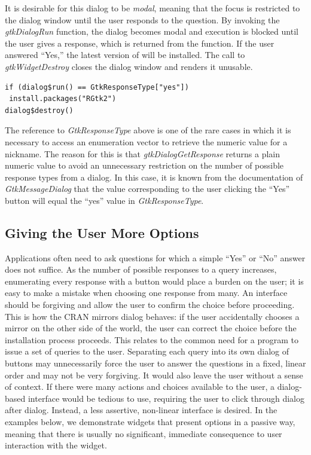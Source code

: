 \documentclass[article]{jss}
\begin{document}
It is desirable for this dialog to be \emph{modal}, meaning that the focus
is restricted to the dialog window until the user responds to the question. By
invoking the \emph{gtkDialogRun} function, the dialog becomes modal and execution
is blocked until the user gives a response, which is returned from the function.
If the user answered ``Yes,'' the latest version of  will be 
installed. The call to \emph{gtkWidgetDestroy} closes the dialog window and 
renders it unusable.
\begin{verbatim}
if (dialog$run() == GtkResponseType["yes"])
 install.packages("RGtk2")
dialog$destroy()
\end{verbatim}
The reference to \emph{GtkResponseType} above is one of the rare cases in which
it is necessary to access an enumeration vector to retrieve the numeric value
for a nickname. The reason for this is that \emph{gtkDialogGetResponse} returns
a plain numeric value to avoid an unnecessary restriction on the number of 
possible response types from a dialog. In this case, it is known from
the documentation of \emph{GtkMessageDialog} that the value corresponding to
the user clicking the ``Yes'' button will equal the ``yes'' value in \emph{GtkResponseType}.

\subsection{Giving the User More Options}

Applications often need to ask questions for which a simple ``Yes'' or ``No''
answer does not suffice. As the number of possible responses to a query increases, 
enumerating every response with a button would place a burden on the user;
it is easy to make a mistake when choosing one response from many. An interface
should be forgiving and allow the user to confirm the choice before proceeding.
This is how the CRAN mirrors dialog behaves: if the user accidentally chooses a 
mirror on the other side of the world, the user can correct the choice before
the installation process proceeds. This relates to the common need for a program 
to issue a set of queries to the user. Separating each query into its own dialog
of buttons may unnecessarily force the user to answer the questions in a 
fixed, linear order and may not be very forgiving. It would also leave
the user without a sense of context. If there were many actions
and choices available to the user, a dialog-based interface would be tedious to 
use, requiring the user to click through dialog after dialog. Instead, a less 
assertive, non-linear interface is desired. In the examples below, we
demonstrate widgets that present options in a passive way, meaning that
there is usually no significant, immediate consequence to user interaction 
with the widget.
\end{document}
